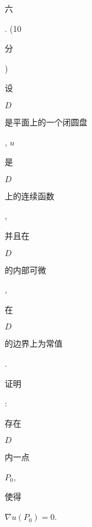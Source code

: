 \documentclass[10pt]{article}
\begin{document}
\begin{CJK}{UTF8}{mj}六\end{CJK}. (10 \begin{CJK}{UTF8}{mj}分\end{CJK}) \begin{CJK}{UTF8}{mj}设\end{CJK} $D$ \begin{CJK}{UTF8}{mj}是平面上的一个闭圆盘\end{CJK}, $u$ \begin{CJK}{UTF8}{mj}是\end{CJK} $D$ \begin{CJK}{UTF8}{mj}上的连续函数\end{CJK}, \begin{CJK}{UTF8}{mj}并且在\end{CJK} $D$ \begin{CJK}{UTF8}{mj}的内部可微\end{CJK}, \begin{CJK}{UTF8}{mj}在\end{CJK} $D$ \begin{CJK}{UTF8}{mj}的边界上为常值\end{CJK}. \begin{CJK}{UTF8}{mj}证明\end{CJK}: \begin{CJK}{UTF8}{mj}存在\end{CJK} $D$ \begin{CJK}{UTF8}{mj}内一点\end{CJK} $P_{0}$, \begin{CJK}{UTF8}{mj}使得\end{CJK} $\nabla u\left(P_{0}\right)=0$.
\end{document}
